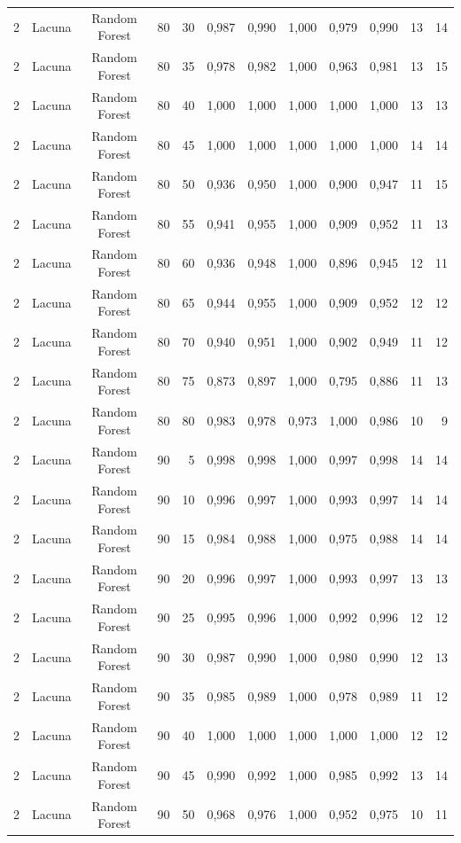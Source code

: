 \begin{longtable}{ccclrrrrrrrr}
2 & Lacuna & Random Forest & 80 & 30 & 0,987 & 0,990 & 1,000 & 0,979 & 0,990 & 13 & 14 \\
2 & Lacuna & Random Forest & 80 & 35 & 0,978 & 0,982 & 1,000 & 0,963 & 0,981 & 13 & 15 \\
2 & Lacuna & Random Forest & 80 & 40 & 1,000 & 1,000 & 1,000 & 1,000 & 1,000 & 13 & 13 \\
2 & Lacuna & Random Forest & 80 & 45 & 1,000 & 1,000 & 1,000 & 1,000 & 1,000 & 14 & 14 \\
2 & Lacuna & Random Forest & 80 & 50 & 0,936 & 0,950 & 1,000 & 0,900 & 0,947 & 11 & 15 \\
2 & Lacuna & Random Forest & 80 & 55 & 0,941 & 0,955 & 1,000 & 0,909 & 0,952 & 11 & 13 \\
2 & Lacuna & Random Forest & 80 & 60 & 0,936 & 0,948 & 1,000 & 0,896 & 0,945 & 12 & 11 \\
2 & Lacuna & Random Forest & 80 & 65 & 0,944 & 0,955 & 1,000 & 0,909 & 0,952 & 12 & 12 \\
2 & Lacuna & Random Forest & 80 & 70 & 0,940 & 0,951 & 1,000 & 0,902 & 0,949 & 11 & 12 \\
2 & Lacuna & Random Forest & 80 & 75 & 0,873 & 0,897 & 1,000 & 0,795 & 0,886 & 11 & 13 \\
2 & Lacuna & Random Forest & 80 & 80 & 0,983 & 0,978 & 0,973 & 1,000 & 0,986 & 10 & 9 \\
2 & Lacuna & Random Forest & 90 & 5 & 0,998 & 0,998 & 1,000 & 0,997 & 0,998 & 14 & 14 \\
2 & Lacuna & Random Forest & 90 & 10 & 0,996 & 0,997 & 1,000 & 0,993 & 0,997 & 14 & 14 \\
2 & Lacuna & Random Forest & 90 & 15 & 0,984 & 0,988 & 1,000 & 0,975 & 0,988 & 14 & 14 \\
2 & Lacuna & Random Forest & 90 & 20 & 0,996 & 0,997 & 1,000 & 0,993 & 0,997 & 13 & 13 \\
2 & Lacuna & Random Forest & 90 & 25 & 0,995 & 0,996 & 1,000 & 0,992 & 0,996 & 12 & 12 \\
2 & Lacuna & Random Forest & 90 & 30 & 0,987 & 0,990 & 1,000 & 0,980 & 0,990 & 12 & 13 \\
2 & Lacuna & Random Forest & 90 & 35 & 0,985 & 0,989 & 1,000 & 0,978 & 0,989 & 11 & 12 \\
2 & Lacuna & Random Forest & 90 & 40 & 1,000 & 1,000 & 1,000 & 1,000 & 1,000 & 12 & 12 \\
2 & Lacuna & Random Forest & 90 & 45 & 0,990 & 0,992 & 1,000 & 0,985 & 0,992 & 13 & 14 \\
2 & Lacuna & Random Forest & 90 & 50 & 0,968 & 0,976 & 1,000 & 0,952 & 0,975 & 10 & 11 \\

\end{longtable}
